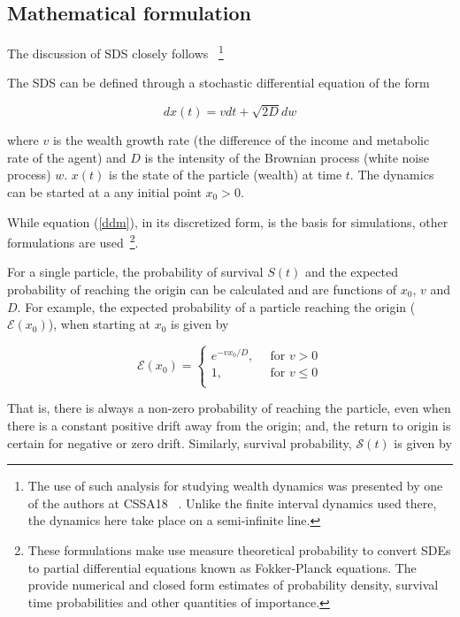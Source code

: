 \documentclass[sigconf]{acmart}
\begin{document}
\subsection{Mathematical formulation}
The discussion of SDS closely follows ~\cite{redner2001guide}\footnote{The use of such analysis for studying wealth dynamics was presented by one of the authors at CSSA18 ~\cite{rv}. Unlike the finite interval dynamics used there, the dynamics here take place on a semi-infinite line.}

The SDS can be defined through a stochastic differential equation of the form 

\begin{equation}\label{ddm}
dx(t) = vdt + \sqrt{2D} dw
\end{equation}

\noindent where $v$ is the wealth growth rate (the difference of the income and metabolic rate of the agent) and $D$ is the intensity of the Brownian process (white noise process) $w$. $x(t)$ is the state of the particle (wealth) at time $t$. The dynamics can be started at a any initial point $x_0 > 0$. 

While equation (\ref{ddm}), in its discretized form, is the basis for simulations, other formulations are used~\cite{redner2001guide,rv}\footnote{These formulations make use measure theoretical probability to convert SDEs to partial differential equations known as Fokker-Planck equations.  The provide numerical and closed form estimates of probability density, survival time probabilities and other quantities of importance.}.

\noindent For a single particle, the probability of survival $S(t)$ and the expected probability of reaching the origin can be calculated and are functions of $x_0$, $v$ and $D$. For example, the expected probability of a particle reaching the origin ($\mathcal{E}(x_0)$), when starting at $x_0$ is given by 

\begin{equation}\label{e}
\mathcal{E}(x_0) = \begin{cases}
e^{-v x_0/D} \text{, } & \text{ for } v > 0 \\
1 \text{, } & \text{ for } v \leq 0 \\
\end{cases}
\end{equation}  

\noindent That is, there is always a non-zero probability of reaching the particle, even when there is a constant positive drift away from the origin; and, the return to origin is certain for negative or zero drift.  Similarly, survival probability, $\mathcal{S}(t)$ is given by 
\end{document}
